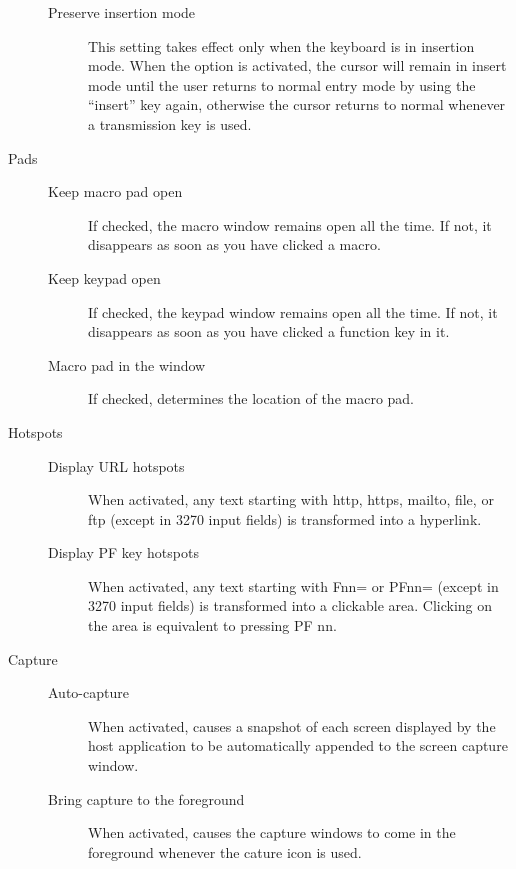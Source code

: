 \documentclass[letterpaper,10pt,english]{sphinxmanual}
\begin{document}
\begin{description}
\begin{description}
\item[{Preserve insertion mode}] \leavevmode
This setting takes effect only when the keyboard is in insertion mode. When the option is activated, the cursor will remain in insert mode until the user returns to normal entry mode by using the “insert” key again, otherwise the cursor returns to normal whenever a transmission key is used.

\end{description}

\item[{Pads}] \leavevmode\begin{description}
\item[{Keep macro pad open}] \leavevmode
If checked, the macro window remains open all the time. If not, it disappears as soon as you have clicked a macro.

\item[{Keep keypad open}] \leavevmode
If checked, the keypad window remains open all the time. If not, it disappears as soon as you have clicked a function key in it.

\item[{Macro pad in the window}] \leavevmode
If checked, determines the location of the macro pad.

\end{description}

\item[{Hotspots}] \leavevmode\begin{description}
\item[{Display URL hotspots}] \leavevmode
When activated, any text starting with http, https, mailto, file, or ftp (except in 3270 input fields) is transformed into a hyperlink.

\item[{Display PF key hotspots}] \leavevmode
When activated, any text starting with Fnn= or PFnn= (except in 3270 input fields) is transformed into a clickable area. Clicking on the area is equivalent to pressing PF nn.

\end{description}

\item[{Capture}] \leavevmode\begin{description}
\item[{Auto-capture}] \leavevmode
When activated, causes a snapshot of each screen displayed by the host application to be automatically appended to the screen capture window.

\item[{Bring capture to the foreground}] \leavevmode
When activated, causes the capture windows to come in the foreground whenever the cature icon is used.


\end{description}
\end{description}
\end{document}

